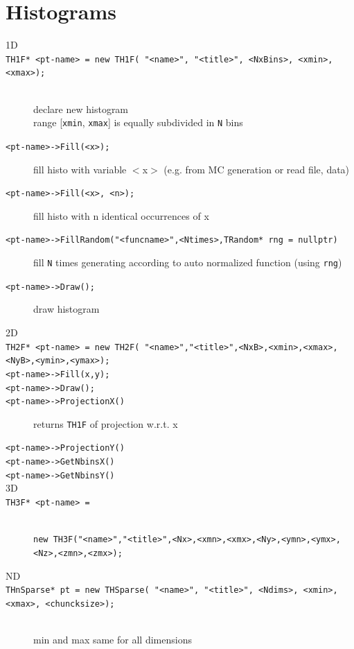 \documentclass[10pt, twoside]{article}
\newcommand{\ttt}[1]{\colorbox{boxgray}{\texttt{#1}}}
\begin{document}
\section{Histograms}
\begin{description}
\item[1D]

\item[\ttt{TH1F* <pt-name> = new TH1F( "<name>", "<title>", <NxBins>, <xmin>, <xmax>);}] \,
\\declare new histogram
\\range [\ttt{xmin}, \ttt{xmax}] is equally subdivided in \ttt{N} bins

\item[\ttt{<pt-name>->Fill(<x>);}] fill histo with variable $<$x$>$ (e.g. from MC generation or read file, data)

\item[\ttt{<pt-name>->Fill(<x>, <n>);}] fill histo with n identical occurrences of x

\item[\ttt{<pt-name>->FillRandom("<funcname>",<Ntimes>,TRandom* rng = nullptr)}] fill \texttt{N} times generating according to auto normalized function (using \texttt{rng})

\item[\ttt{<pt-name>->Draw();}] draw histogram

\item[2D]

\item[\ttt{TH2F* <pt-name> = new TH2F( "<name>","<title>",<NxB>,<xmin>,<xmax>,<NyB>,<ymin>,<ymax>);}]

\item[\ttt{<pt-name>->Fill(x,y);}]
\item[\ttt{<pt-name>->Draw();}]

\item[\ttt{<pt-name>->ProjectionX()}] returns \texttt{TH1F} of projection w.r.t. x
\item[\ttt{<pt-name>->ProjectionY()}]
\item[\ttt{<pt-name>->GetNbinsX()}]
\item[\ttt{<pt-name>->GetNbinsY()}]

\item[3D]

\item[\ttt{TH3F* <pt-name> =}] \, \\
\ttt{new TH3F("<name>","<title>",<Nx>,<xmn>,<xmx>,<Ny>,<ymn>,<ymx>,<Nz>,<zmn>,<zmx>);}

\item[ND]

\item[\ttt{THnSparse* pt = new THSparse( "<name>", "<title>", <Ndims>, <xmin>, <xmax>, <chuncksize>);}] \,
\\min and max same for all dimensions
\end{description}
\end{document}
